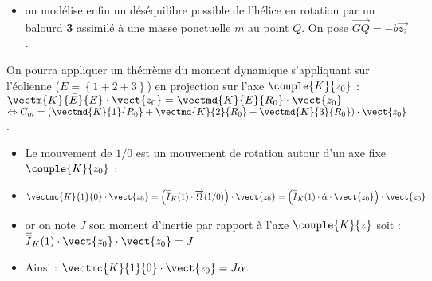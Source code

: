 \begin{multicols}{2}
\begin{itemize}
\item on modélise enfin un déséquilibre possible de l'hélice en rotation par un balourd \textbf{3} assimilé à une masse ponctuelle $m$ au point $Q$. On pose $\overrightarrow{GQ}=-b\overrightarrow{z_2}$.
\end{itemize}

\fi

\ifprof
\begin{corrige}

\end{corrige}
\else
\fi


\ifprof
\begin{corrige}
On pourra appliquer un théorème du moment dynamique s'appliquant sur l'éolienne ($E=\left\{1+2+3\right\}$) en projection sur l'axe $\couple{K}{{z}_0}$  : 
$\vectm{K}{\bar E}{E}\cdot \vect{z_0}=\vectmd{K}{E}{R_0}\cdot \vect{z_0}$
$\Leftrightarrow
C_m=\left(\vectmd{K}{1}{R_0}+\vectmd{K}{2}{R_0}+\vectmd{K}{3}{R_0}\right)\cdot \vect{z_0}$.
\end{corrige}
\else
\fi


\ifprof
\begin{corrige}
\begin{itemize}
\item Le mouvement de $1/0$ est un mouvement de rotation autour d'un axe fixe $\couple{K}{{z}_0}$ : 

\item $\vectmc{K}{1}{0}\cdot \vect{z_0}=\left(\overline{\overline{I}}_K(1)\cdot \overrightarrow{\Omega}(1/0)\right)\cdot \vect{z_0}=\left(\overline{\overline{I}}_K(1)\cdot \dot{\alpha}\cdot \vect{z_0} \right)\cdot \vect{z_0}$

\item or on note $J$ son moment d'inertie par rapport à l'axe $\couple{K}{{z}}$ soit : 
$
\overline{\overline{I}}_K(1)\cdot\vect{z_0}\cdot \vect{z_0}=J
$

\item Ainsi : 
$
\vectmc{K}{1}{0}\cdot \vect{z_0}=J \dot{\alpha}
$.
\end{itemize}
\end{corrige}
\else
\fi



\end{multicols}
